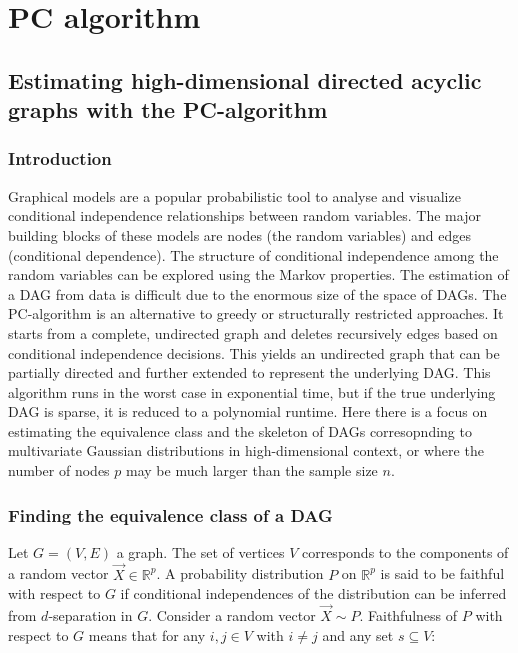 \chapter{PC algorithm}

\section{Estimating high-dimensional directed acyclic graphs with the PC-algorithm}

	\subsection{Introduction}
	Graphical models are a popular probabilistic tool to analyse and visualize conditional independence relationships between random variables.
	The major building blocks of these models are nodes (the random variables) and edges (conditional dependence).
	The structure of conditional independence among the random variables can be explored using the Markov properties.
	The estimation of a DAG from data is difficult due to the enormous size of the space of DAGs.
	The PC-algorithm is an alternative to greedy or structurally restricted approaches.
	It starts from a complete, undirected graph and deletes recursively edges based on conditional independence decisions.
	This yields an undirected graph that can be partially directed and further extended to represent the underlying DAG.
	This algorithm runs in the worst case in exponential time, but if the true underlying DAG is sparse, it is reduced to a polynomial runtime.
	Here there is a focus on estimating the equivalence class and the skeleton of DAGs corresopnding to multivariate Gaussian distributions in high-dimensional context, or where the number of nodes $p$ may be much larger than the sample size $n$.

	\subsection{Finding the equivalence class of a DAG}
	Let $G=(V,E)$ a graph.
	The set of vertices $V$ corresponds to the components of a random vector $\vec{X}\in\mathbb{R}^p$.
	A probability distribution $P$ on $\mathbb{R}^p$ is said to be faithful with respect to $G$ if conditional independences of the distribution can be inferred from $d$-separation in $G$.
	Consider a random vector $\vec{X}\sim P$.
	Faithfulness of $P$ with respect to $G$ means that for any $i,j\in V$ with $i\neq j$ and any set $s\subseteq V$:

